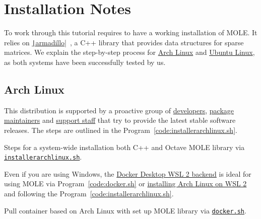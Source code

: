 \chapter{Installation Notes}

To work through this tutorial requires to have a working installation
of MOLE.
It relies on
\href{https://gitlab.com/conradsnicta/armadillo-code}{\texttt|armadillo|}~\cite{Sanderson2019},
a C++ library that provides data structures for sparse matrices.
We explain the step-by-step process for
\href{https://wiki.archlinux.org/title/Pacman/Rosetta}{Arch Linux}
and \href{https://help.ubuntu.com/lts/ubuntu-help/index.html}{Ubuntu Linux},
as both systems have been successfully tested by us.

\section{Arch Linux}

This distribution is supported by a proactive group of
\href{https://archlinux.org/people/developers}{developers},
\href{https://archlinux.org/people/package-maintainers}{package maintainers}
and \href{https://archlinux.org/people/support-staff}{support staff}
that try to provide the latest stable software releases.
The steps are outlined in the Program~\ref{code:installerarchlinux.sh}.

\begin{listing}[ht!]
	\tiny
	\centering
	\caption{Steps for a system-wide installation both C++ and Octave
		MOLE library via
		\href{https://raw.githubusercontent.com/carlosal1015/mole_examples/main/tutorial/installerarchlinux.sh}{\texttt{installerarchlinux.sh}}.}
	\label{code:installerarchlinux.sh}
\end{listing}

Even if you are using Windows, the
\href{https://docs.docker.com/desktop/features/wsl}{Docker Desktop WSL 2 backend}
is ideal for using MOLE via Program~\ref{code:docker.sh} or
\href{https://wiki.archlinux.org/title/Install_Arch_Linux_on_WSL}{installing Arch Linux on WSL 2} and following
the Program~\ref{code:installerarchlinux.sh}.

\begin{listing}[ht!]
	\tiny
	\centering
	\caption{Pull container based on Arch Linux with set up MOLE
		library via \href{https://raw.githubusercontent.com/carlosal1015/mole_examples/main/tutorial/docker.sh}{\texttt{docker.sh}}.}
	\label{code:docker.sh}
\end{listing}

